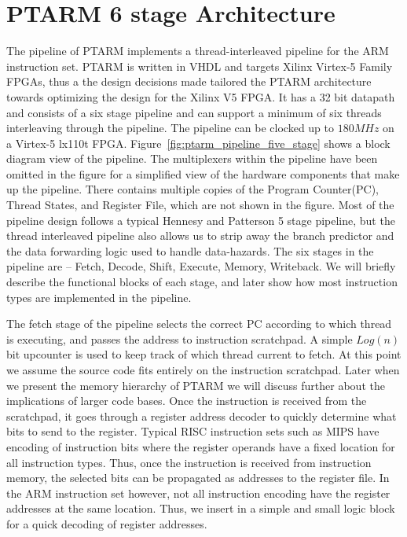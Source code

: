 \section{PTARM 6 stage Architecture}

The pipeline of PTARM implements a thread-interleaved pipeline for the ARM instruction set.
PTARM is written in VHDL and targets Xilinx Virtex-5 Family FPGAs, thus a the design decisions made tailored the PTARM architecture towards optimizing the design for the Xilinx V5 FPGA.
It has a 32 bit datapath and consists of a six stage pipeline and can support a minimum of six threads interleaving through the pipeline.
The pipeline can be clocked up to $180MHz$ on a Virtex-5 lx110t FPGA.  
Figure~\ref{fig:ptarm_pipeline_five_stage} shows a block diagram view of the pipeline. 
The multiplexers within the pipeline have been omitted in the figure for a simplified view of the hardware components that make up the pipeline.
There contains multiple copies of the Program Counter(PC), Thread States, and Register File, which are not shown in the figure.
Most of the pipeline design follows a typical Hennesy and Patterson 5 stage pipeline, but the thread interleaved pipeline also allows us to strip away the branch predictor and the data forwarding logic used to handle data-hazards.
The six stages in the pipeline are -- Fetch, Decode, Shift, Execute, Memory, Writeback.
We will briefly describe the functional blocks of each stage, and later show how most instruction types are implemented in the pipeline.  

The fetch stage of the pipeline selects the correct PC according to which thread is executing, and passes the address to instruction scratchpad.
A simple $Log(n)$ bit upcounter is used to keep track of which thread current to fetch.  
At this point we assume the source code fits entirely on the instruction scratchpad.
Later when we present the memory hierarchy of PTARM we will discuss further about the implications of larger code bases.
Once the instruction is received from the scratchpad, it goes through a register address decoder to quickly determine what bits to send to the register.
Typical RISC instruction sets such as MIPS have encoding of instruction bits where the register operands have a fixed location for all instruction types.
Thus, once the instruction is received from instruction memory, the selected bits can be propagated as addresses to the register file. 
In the ARM instruction set however, not all instruction encoding have the register addresses at the same location. 
Thus, we insert in a simple and small logic block for a quick decoding of register addresses.

